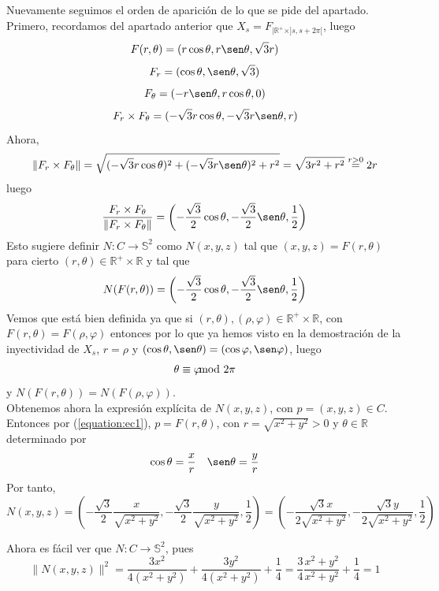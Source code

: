 \documentclass[12pt]{article}
\newcommand{\R}{\mathbb{R}}
\newcommand{\Rmas}{\R^{+}}
\newcommand{\Ss}{\mathbb{S}}
\newcommand{\norma}[1]{\lVert #1 \rVert}
\begin{document}
\begin{ejercicio}
\begin{enumerate}
            Nuevamente seguimos el orden de aparición de lo que se pide del apartado. Primero, recordamos del apartado anterior que $X_s = F_{|\Rmas \times ]s, s + 2\pi[}$,
            luego
            $$F(r,\theta) = (r \cos \theta, r \sen \theta, \sqrt{3}r)$$
            $$F_r = (\cos \theta, \sen \theta, \sqrt{3})$$
            $$F_\theta = (-r \sen \theta, r \cos \theta, 0)$$
            $$F_r \times F_\theta = (-\sqrt{3}r \cos \theta, -\sqrt{3} r \sen \theta, r) $$
            Ahora, 
            $$\norma{F_r \times F_\theta} = \sqrt{(-\sqrt{3}r \cos \theta)^2 + (-\sqrt{3} r \sen \theta)^2 + r^2} = 
            \sqrt{3r^2 + r^2} \stackrel{r>0}{=} 2r$$
            luego
            $$\dfrac{F_r \times F_\theta}{\norma{F_r \times F_\theta}} = \left( -\dfrac{\sqrt{3}}{2} \cos \theta, 
            -\dfrac{\sqrt{3}}{2} \sen \theta, \dfrac{1}{2} \right)$$
            Esto sugiere definir $N : C \to \Ss^2$ como $N(x,y,z)$ tal que $(x,y,z) = F(r, \theta)$ para cierto $(r, \theta) \in \Rmas \times \R$ y tal que 
            $$N(F(r,\theta)) = \left( -\dfrac{\sqrt{3}}{2} \cos \theta, -\dfrac{\sqrt{3}}{2} \sen \theta, \dfrac{1}{2} \right)$$
            Vemos que está bien definida ya que si $(r,\theta), (\rho, \varphi) \in \Rmas \times \R$, con $F(r,\theta) = F(\rho, \varphi)$ entonces por lo 
            que ya hemos visto en la demostración de la inyectividad de $X_s$, $r = \rho$ y $(\cos \theta, \sen \theta) = (\cos \varphi, \sen \varphi)$,
            luego $$\theta \equiv \varphi \hspace{-0.3cm} \mod 2 \pi$$
            y $N(F(r, \theta)) = N(F(\rho, \varphi))$. \\
            
            Obtenemos ahora la expresión explícita de $N(x,y,z)$, con $p = (x,y,z) \in C$. Entonces por (\ref{equation:ec1}), $p = F(r,\theta)$,
            con $r = \sqrt{x^2 + y^2} > 0$ y $\theta \in \R$ determinado por $$\cos \theta = \dfrac{x}{r} \quad \sen \theta = \dfrac{y}{r}$$
            Por tanto, $$N(x,y,z) = \left( -\dfrac{\sqrt{3}}{2} \dfrac{x}{\sqrt{x^2 + y^2}}, -\dfrac{\sqrt{3}}{2} \dfrac{y}{\sqrt{x^2 + y^2}}, 
            \dfrac{1}{2} \right) = \left( -\dfrac{\sqrt{3}x}{2\sqrt{x^2 + y^2}}, -\dfrac{\sqrt{3}y}{2\sqrt{x^2 + y^2}}, 
            \dfrac{1}{2} \right)$$

            Ahora es fácil ver que $N : C \to \Ss^2$, pues
            $$\norma{N(x,y,z)}^2 = \dfrac{3x^2}{4(x^2 + y^2)} + \dfrac{3y^2}{4(x^2 + y^2)} + \dfrac{1}{4} = \dfrac{3}{4} \dfrac{x^2 + y^2}{x^2 + y^2}
            + \dfrac{1}{4} = 1$$


\end{enumerate}
\end{ejercicio}
\end{document}
